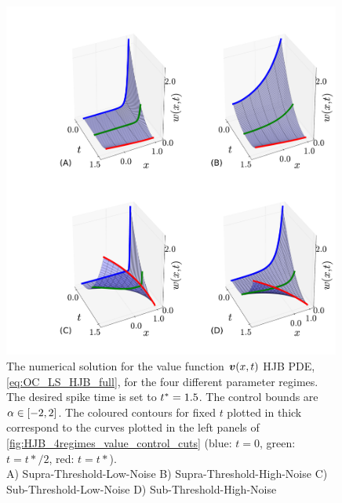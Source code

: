 \documentclass[12pt]{iopart}
\begin{document}
\begin{figure}[h!]
\begin{center}
\includegraphics[width=0.99\textwidth]{Figs/HJB/Regimes_valuesurf.pdf}
\caption{The numerical solution for the value function ${ \boldsymbol{v} }(x,t)$ HJB PDE,
\cref{eq:OC_LS_HJB_full}, for the four different parameter regimes.
The desired spike time is set to ${ t^* }=1.5$.
The control bounds are ${\alpha} \in [-2,2]$. 
The coloured contours for fixed $t$ plotted in thick correspond to the
curves plotted in the left panels of \cref{fig:HJB_4regimes_value_control_cuts}
(blue: $t=0$, green: $t=t*/2$, red: $t=t*$).
\\
A) Supra-Threshold-Low-Noise
B) Supra-Threshold-High-Noise
C) Sub-Threshold-Low-Noise 
D) Sub-Threshold-High-Noise  }
\label{fig:HJB_4regimes_value_surf}
\end{center}
\end{figure}
\end{document}
